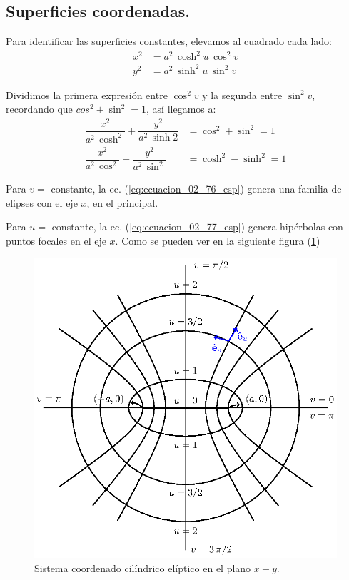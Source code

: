 \subsection{Superficies coordenadas.}

Para identificar las superficies constantes, elevamos al cuadrado cada lado:
\begin{align}
x^{2} &= a^{2} \, \cosh^{2} u \, \cos^{2} v \label{eq:ecuacion_02_74_esp} \\
y^{2} &= a^{2} \, \sinh^{2} u \, \sin^{2} v \label{eq:ecuacion_02_75_esp}
\end{align}

Dividimos la primera expresión entre $\cos^{2} v$ y la segunda entre $\sin^{2} v$, recordando que $cos^{2} + \sin^{2} = 1$, así llegamos a:
\begin{align}
\dfrac{x^{2}}{a^{2} \, \cosh^{2}} + \dfrac{y^{2}}{a^{2} \, \sinh{2}} &= \cos^{2} + \sin^{2} = 1 \label{eq:ecuacion_02_76_esp}\\[1em]
\dfrac{x^{2}}{a^{2} \, \cos^{2}} - \dfrac{y^{2}}{a^{2} \, \sin^{2}} &= \cosh^{2} - \sinh^{2} = 1 \label{eq:ecuacion_02_77_esp}
\end{align}

Para $v=$ constante, la ec. (\ref{eq:ecuacion_02_76_esp}) genera una familia de elipses con el eje $x$, en el principal.
\par
Para $u=$ constante, la ec. (\ref{eq:ecuacion_02_77_esp}) genera hipérbolas con puntos focales en el eje $x$. Como se pueden ver en la siguiente figura (\ref{fig:figura_coordenada_cilindricas_elipticas})

\begin{figure}[H]
    \centering
    \includegraphics[scale=1]{Imagenes/Sistema_Cilindrico_Eliptico.eps}
    \caption{Sistema coordenado cilíndrico elíptico en el plano $x-y$.}
    \label{fig:figura_coordenada_cilindricas_elipticas}
\end{figure}

